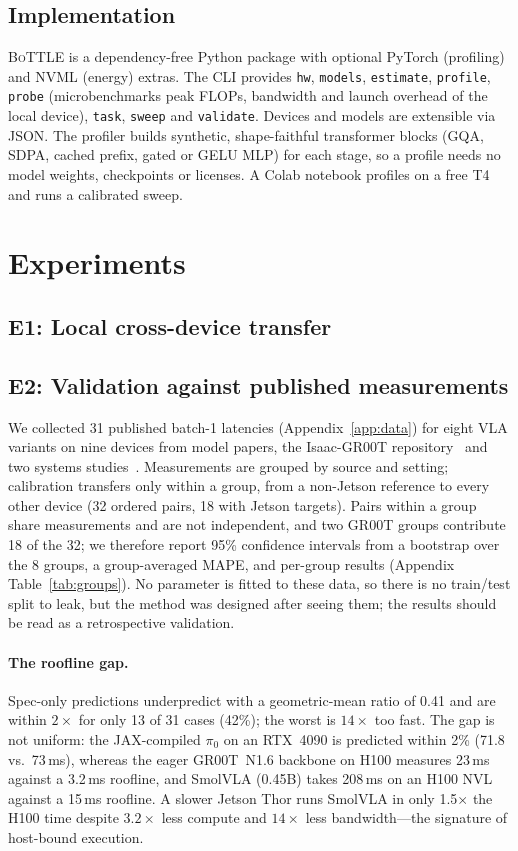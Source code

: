 \documentclass[10pt]{article}
\newcommand{\bottle}{\textsc{BoTTLE}}
\begin{document}
\subsection{Implementation}
\bottle{} is a dependency-free Python package with optional PyTorch (profiling) and NVML (energy)
extras. The CLI provides \texttt{hw}, \texttt{models}, \texttt{estimate}, \texttt{profile},
\texttt{probe} (microbenchmarks peak FLOPs, bandwidth and launch overhead of the local device),
\texttt{task}, \texttt{sweep} and \texttt{validate}. Devices and models are extensible via JSON.
The profiler builds synthetic, shape-faithful transformer blocks (GQA, SDPA, cached prefix, gated
or GELU MLP) for each stage, so a profile needs no model weights, checkpoints or licenses. A Colab
notebook profiles on a free T4 and runs a calibrated sweep.

\section{Experiments}
\subsection{E1: Local cross-device transfer}\label{sec:e1}


\subsection{E2: Validation against published measurements}\label{sec:e2}
We collected 31 published batch-1 latencies (Appendix~\ref{app:data}) for eight VLA variants on
nine devices from model papers, the Isaac-GR00T repository~\citep{isaacgr00t} and two systems
studies~\citep{waseem2026where,xu2026hwbench}. Measurements are grouped by source and setting;
calibration transfers only within a group, from a non-Jetson reference to every other device
(32 ordered pairs, 18 with Jetson targets). Pairs within a group share measurements and are not
independent, and two GR00T groups contribute 18 of the 32; we therefore report 95\% confidence
intervals from a bootstrap over the 8 groups, a group-averaged MAPE, and per-group results
(Appendix Table~\ref{tab:groups}). No parameter is fitted to these data, so there is no
train/test split to leak, but the method was designed after seeing them; the results should be
read as a retrospective validation.

\paragraph{The roofline gap.} Spec-only predictions underpredict with a geometric-mean ratio of
0.41 and are within $2\times$ for only 13 of 31 cases (42\%); the worst is $14\times$ too fast. The gap is not uniform: the JAX-compiled $\pi_0$
on an RTX~4090 is predicted within 2\% (71.8 vs.\ 73\,ms), whereas the eager GR00T~N1.6 backbone
on H100 measures 23\,ms against a 3.2\,ms roofline, and SmolVLA (0.45B) takes 208\,ms on an H100
NVL against a 15\,ms roofline. A slower Jetson Thor runs SmolVLA in only 1.5$\times$ the H100 time
despite $3.2\times$ less compute and $14\times$ less bandwidth---the signature of host-bound
execution.
\end{document}
